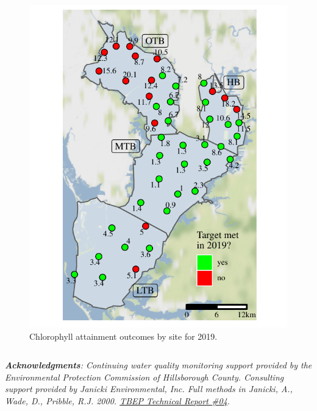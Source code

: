 \documentclass[final,t]{beamer}\usepackage[]{graphicx}\usepackage[]{color}
\begin{document}
\begin{frame}
\begin{columns}[t]
\begin{column}{.65\linewidth}
\begin{columns}[t]
\begin{column}{0.28\textwidth}
\begin{figure}
\centerline{\includegraphics[trim = 0cm 0cm 0cm -1.25cm, width=1.1\linewidth]{figure/sitemap.pdf}}
\caption{\footnotesize Chlorophyll attainment outcomes by site for 2019.}
\label{fig:sitemap}
\end{figure}

\end{column}

\end{columns}

\vspace{-0.5cm}

\tiny \textit{\textbf{Acknowledgments}: Continuing water quality monitoring support provided by the Environmental Protection Commission of Hillsborough County.  Consulting support provided by Janicki Environmental, Inc.  Full methods in Janicki, A., Wade, D., Pribble, R.J. 2000. \href{https://www.tbeptech.org/TBEP_TECH_PUBS/2000/TBEP_04_00Chlor-A.pdf}{TBEP Technical Report \#04}.} \\

\end{column}

\end{columns}

\end{frame}
\end{document}
